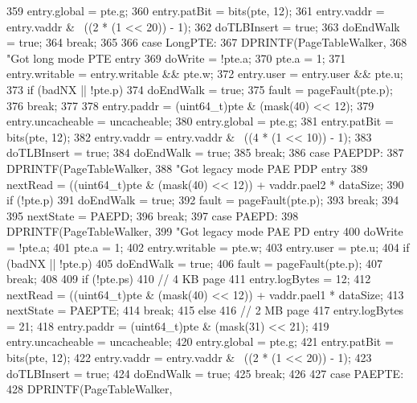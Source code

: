 \begin{DoxyCode}
{{{359             entry.global = pte.g;
360             entry.patBit = bits(pte, 12);
361             entry.vaddr = entry.vaddr & ~((2 * (1 << 20)) - 1);
362             doTLBInsert = true;
363             doEndWalk = true;
364             break;
365         }
366       case LongPTE:
367         DPRINTF(PageTableWalker,
368                 "Got long mode PTE entry %
369         doWrite = !pte.a;
370         pte.a = 1;
371         entry.writable = entry.writable && pte.w;
372         entry.user = entry.user && pte.u;
373         if (badNX || !pte.p) {
374             doEndWalk = true;
375             fault = pageFault(pte.p);
376             break;
377         }
378         entry.paddr = (uint64_t)pte & (mask(40) << 12);
379         entry.uncacheable = uncacheable;
380         entry.global = pte.g;
381         entry.patBit = bits(pte, 12);
382         entry.vaddr = entry.vaddr & ~((4 * (1 << 10)) - 1);
383         doTLBInsert = true;
384         doEndWalk = true;
385         break;
386       case PAEPDP:
387         DPRINTF(PageTableWalker,
388                 "Got legacy mode PAE PDP entry %
389         nextRead = ((uint64_t)pte & (mask(40) << 12)) + vaddr.pael2 * dataSize;
390         if (!pte.p) {
391             doEndWalk = true;
392             fault = pageFault(pte.p);
393             break;
394         }
395         nextState = PAEPD;
396         break;
397       case PAEPD:
398         DPRINTF(PageTableWalker,
399                 "Got legacy mode PAE PD entry %
400         doWrite = !pte.a;
401         pte.a = 1;
402         entry.writable = pte.w;
403         entry.user = pte.u;
404         if (badNX || !pte.p) {
405             doEndWalk = true;
406             fault = pageFault(pte.p);
407             break;
408         }
409         if (!pte.ps) {
410             // 4 KB page
411             entry.logBytes = 12;
412             nextRead = ((uint64_t)pte & (mask(40) << 12)) + vaddr.pael1 * 
      dataSize;
413             nextState = PAEPTE;
414             break;
415         } else {
416             // 2 MB page
417             entry.logBytes = 21;
418             entry.paddr = (uint64_t)pte & (mask(31) << 21);
419             entry.uncacheable = uncacheable;
420             entry.global = pte.g;
421             entry.patBit = bits(pte, 12);
422             entry.vaddr = entry.vaddr & ~((2 * (1 << 20)) - 1);
423             doTLBInsert = true;
424             doEndWalk = true;
425             break;
426         }
427       case PAEPTE:
428         DPRINTF(PageTableWalker,
}}
\end{DoxyCode}
